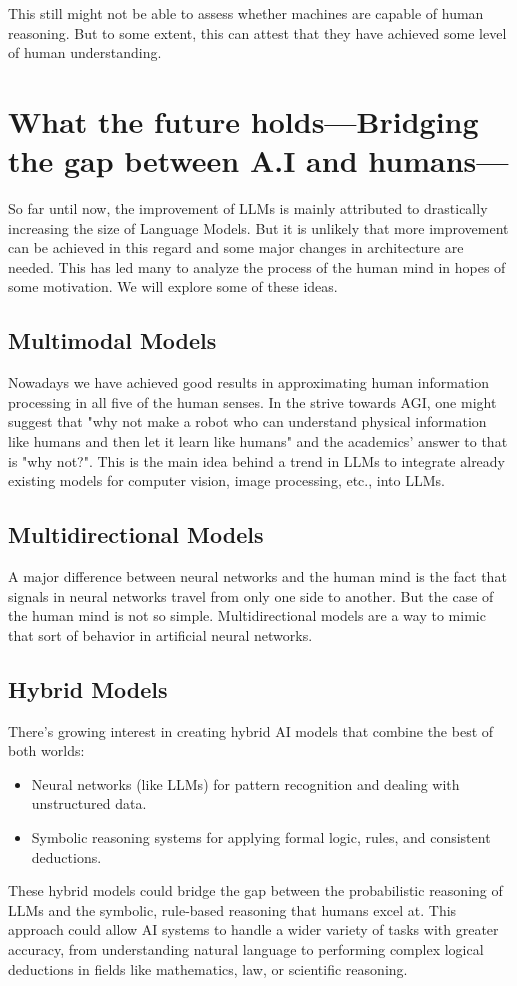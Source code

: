 This still might not be able to assess whether machines are capable of human reasoning. But to some extent, this can attest that they have achieved some level of human understanding.


\section*{What the future holds—Bridging the gap between A.I and humans—}

So far until now, the improvement of LLMs is mainly attributed to drastically increasing the size of Language Models. But it is unlikely that more improvement can be achieved in this regard and some major changes in architecture are needed. This has led many to analyze the process of the human mind in hopes of some motivation. We will explore some of these ideas.

\subsection*{Multimodal Models}
Nowadays we have achieved good results in approximating human information processing in all five of the human senses. In the strive towards AGI, one might suggest that "why not make a robot who can understand physical information like humans and then let it learn like humans" and the academics' answer to that is "why not?". This is the main idea behind a trend in LLMs to integrate already existing models for computer vision, image processing, etc., into LLMs.

\subsection*{Multidirectional Models}
A major difference between neural networks and the human mind is the fact that signals in neural networks travel from only one side to another. But the case of the human mind is not so simple. Multidirectional models are a way to mimic that sort of behavior in artificial neural networks.

\subsection*{Hybrid Models}
There’s growing interest in creating hybrid AI models that combine the best of both worlds:
\begin{itemize}
    \item Neural networks (like LLMs) for pattern recognition and dealing with unstructured data.
    \item Symbolic reasoning systems for applying formal logic, rules, and consistent deductions.
\end{itemize}
These hybrid models could bridge the gap between the probabilistic reasoning of LLMs and the symbolic, rule-based reasoning that humans excel at. This approach could allow AI systems to handle a wider variety of tasks with greater accuracy, from understanding natural language to performing complex logical deductions in fields like mathematics, law, or scientific reasoning.

%



